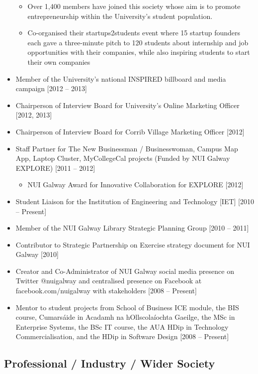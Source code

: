 \documentclass[10pt,a4paper]{res} %
\begin{document}
\begin{resume}
\begin{itemize}
\begin{itemize}
\item Over 1,400 members have joined this society whose aim is to promote entrepreneurship within the University's student population.
\item Co-organised their startups2students event where 15 startup founders each gave a three-minute pitch to 120 students about internship and job opportunities with their companies, while also inspiring students to start their own companies
\end{itemize}
\item Member of the University's national INSPIRED billboard and media campaign [2012 -- 2013] 
\item Chairperson of Interview Board for University's Online Marketing Officer [2012, 2013]
\item Chairperson of Interview Board for Corrib Village Marketing Officer [2012]
\item Staff Partner for The New Businessman / Businesswoman, Campus Map App, Laptop Cluster, MyCollegeCal projects (Funded by NUI Galway EXPLORE) [2011 -- 2012]
\begin{itemize} \itemsep -2pt
\item NUI Galway Award for Innovative Collaboration for EXPLORE [2012]
\end{itemize}
\item Student Liaison for the Institution of Engineering and Technology [IET] [2010 -- Present]
\item Member of the NUI Galway Library Strategic Planning Group [2010 -- 2011]
\item Contributor to Strategic Partnership on Exercise strategy document for NUI Galway [2010]
\item Creator and Co-Administrator of NUI Galway social media presence on Twitter @nuigalway and centralised presence on Facebook at facebook.com/nuigalway with stakeholders [2008 -- Present]
\item Mentor to student projects from School of Business ICE module, the BIS course, Cumars\'{a}ide in Acadamh na hOllscola\'{i}ochta Gaeilge, the MSc in Enterprise Systems, the BSc IT course, the AUA HDip in Technology Commercialisation, and the HDip in Software Design [2008 -- Present]
\end{itemize}

\subsection*{Professional / Industry / Wider Society}


\end{resume}
\end{document}

